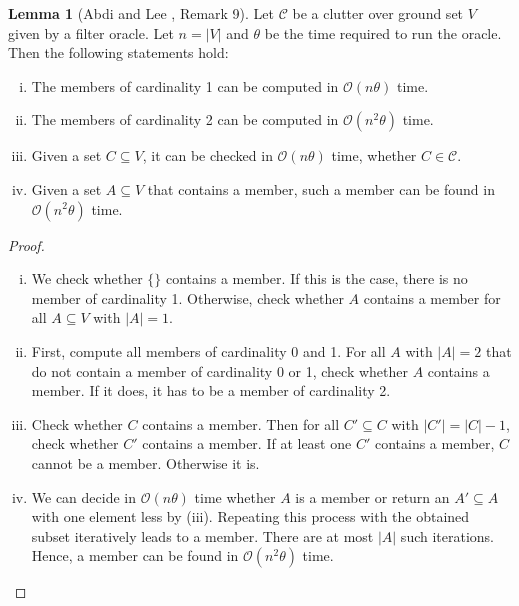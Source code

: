 \documentclass[a4paper, 12pt]{scrbook}
\theoremstyle{definition}
\newtheorem{lemma}[theorem]{Lemma}
\begin{document}
   \begin{lemma}[Abdi and Lee \cite{deltas}, Remark 9]\label{computations}
       Let $\mathcal{C}$ be a clutter over ground set $V$ given by a filter oracle.
       Let $n=|V|$ and $\theta$ be the time required to run the oracle.
       Then the following statements hold:
       \begin{enumerate}[(i)]
           \item The members of cardinality 1 can be computed in $\mathcal{O}(n\theta)$ time.
           \item The members of cardinality 2 can be computed in $\mathcal{O}(n^2\theta)$ time.
           \item Given a set $C \subseteq V$, it can be checked in $\mathcal{O}(n\theta)$ time, whether $C \in \mathcal{C}$.
           \item Given a set $A \subseteq V$ that contains a member, such a member can be found in $\mathcal{O}(n^2\theta)$ time.
       \end{enumerate}
   \end{lemma}
   \begin{proof}
       \leavevmode
       \begin{enumerate}[(i)]
           \item We check whether $\{\}$ contains a member. If this is the case, there is no member of cardinality 1. Otherwise, check whether $A$ contains a member for all $A \subseteq V$ with $|A|=1$.
           \item First, compute all members of cardinality 0 and 1. For all $A$ with $|A|=2$ that do not contain a member of cardinality 0 or 1, check whether $A$ contains a member. If it does, it has to be a member of cardinality 2.
           \item Check whether $C$ contains a member. Then for all $C' \subseteq C$ with $|C'|=|C|-1$, check whether $C'$ contains a member. If at least one $C'$ contains a member, $C$ cannot be a member. Otherwise it is.
           \item We can decide in $\mathcal{O}(n\theta)$ time whether $A$ is a member or return an $A' \subseteq A$ with one element less by (iii). Repeating this process with the obtained subset iteratively leads to a member. There are at most $|A|$ such iterations. Hence, a member can be found in $\mathcal{O}(n^2\theta)$ time.
       \end{enumerate}

   \end{proof}
\end{document}
